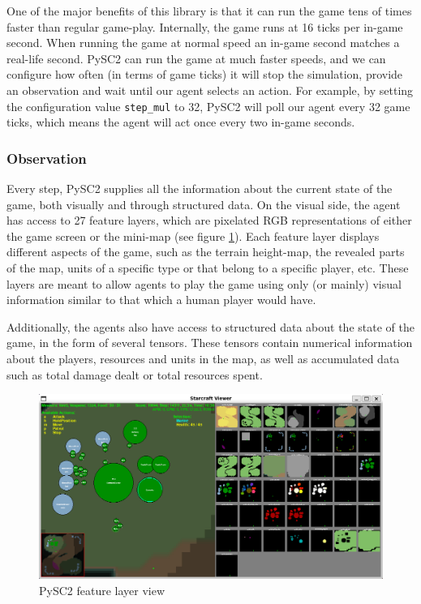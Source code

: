 One of the major benefits of this library is that it can run the game tens of times faster than regular game-play. Internally, the game runs at 16 ticks per in-game second. When running the game at normal speed an in-game second matches a real-life second. PySC2 can run the game at much faster speeds, and we can configure how often (in terms of game ticks) it will stop the simulation, provide an observation and wait until our agent selects an action. For example, by setting the configuration value \texttt{step\_mul} to 32, PySC2 will poll our agent every 32 game ticks, which means the agent will act once every two in-game seconds.

\subsubsection*{Observation}

Every step, PySC2 supplies all the information about the current state of the game, both visually and through structured data. On the visual side, the agent has access to 27 feature layers, which are pixelated RGB representations of either the game screen or the mini-map (see figure \ref{fig:feature_layers}). Each feature layer displays different aspects of the game, such as the terrain height-map, the revealed parts of the map, units of a specific type or that belong to a specific player, etc. These layers are meant to allow agents to play the game using only (or mainly) visual information similar to that which a human player would have.

Additionally, the agents also have access to structured data about the state of the game, in the form of several tensors. These tensors contain numerical information about the players, resources and units in the map, as well as accumulated data such as total damage dealt or total resources spent.

\begin{figure}[h]
    \centering
    \includegraphics[width=1\textwidth]{figs/feature_layers.png}
    \caption{PySC2 feature layer view}
    \label{fig:feature_layers}
\end{figure}

